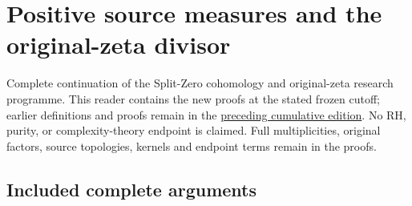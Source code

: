 \chapter{Positive source measures and the original-zeta
divisor}\label{positive-source-measures-and-the-original-zeta-divisor}

Complete continuation of the Split-Zero cohomology and original-zeta
research programme. This reader contains the new proofs at the stated
frozen cutoff; earlier definitions and proofs remain in the
\href{https://github.com/KokunoYumeto/zeta-function-research-reader/blob/36a82ecca98addb8a98b48204e349737856c7223/workbenches/splitzero-tandem/continuations/20260924-cohomology-weight-and-character-lifts/README.md}{preceding
cumulative edition}. No RH, purity, or complexity-theory endpoint is
claimed. Full multiplicities, original factors, source topologies,
kernels and endpoint terms remain in the proofs.

\section{Included complete arguments}\label{included-complete-arguments}

